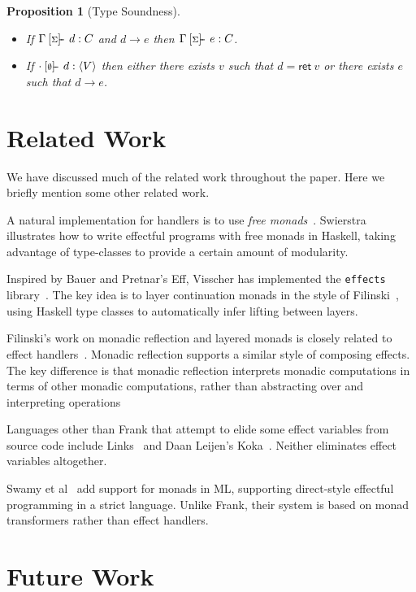 \documentclass[preprint]{sigplanconf}
\newcommand{\reducesto}{\longrightarrow}
\newcommand{\sigentails}[1]{\mathbin{[{\text{\scriptsize ${#1}$}}]\!\text{-\!-}}\,}
\newcommand{\comp}[4]  {#1 \sigentails{#2} {#3} : {#4}}
\newcommand{\rt}[1]{\langle{#1}\rangle}   %
\newcommand{\compgs}{\comp{\Gamma}{\sigs}}
\newtheorem{proposition}[theorem]{Proposition}
\newcommand{\sigs}{\Sigma}
\newcommand{\key}[1]{\mathsf{#1}}
\begin{document}
\begin{proposition}[Type Soundness]
~
\begin{itemize}
\item If $\compgs{d}{C}$ and $d \reducesto e$ then $\compgs{e}{C}$.
\item If $\comp{\cdot}{\emptyset}{d}{\rt{V}}$ then either there exists $v$
  such that $d = \key{ret}~v$ or there exists $e$ such that $d \reducesto
  e$.
\end{itemize}
\end{proposition}

\section{Related Work}
\label{sec:related}

We have discussed much of the related work throughout the paper. Here
we briefly mention some other related work.

A natural implementation for handlers is to use \emph{free
  monads}~\cite{KammarLO13}. Swierstra~\cite{Swierstra08} illustrates
how to write effectful programs with free monads in Haskell, taking
advantage of type-classes to provide a certain amount of modularity.

Inspired by Bauer and Pretnar's Eff, Visscher has implemented the
\texttt{effects} library~\cite{Visscher12}. The key idea is to layer
continuation monads in the style of Filinski~\cite{Filinski99}, using
Haskell type classes to automatically infer lifting between layers.

Filinski's work on monadic reflection and layered monads is closely
related to effect handlers~\cite{Filinski10}. Monadic reflection
supports a similar style of composing effects. The key difference is
that monadic reflection interprets monadic computations in terms of
other monadic computations, rather than abstracting over and
interpreting operations

Languages other than Frank that attempt to elide some effect variables
from source code include Links~\cite{LindleyC12} and Daan Leijen's
Koka~\cite{Leijen13}. Neither eliminates effect variables altogether.

Swamy et al~\cite{SwamyGLH11} add support for monads in ML, supporting
direct-style effectful programming in a strict language. Unlike Frank,
their system is based on monad transformers rather than effect
handlers.


\section{Future Work}
\label{sec:future}
\end{document}
